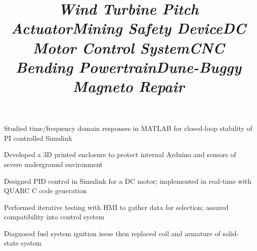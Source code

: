 \documentclass[mm]{res}
\newcommand{\tb}{\textbullet \xspace}
\begin{document}
\begin{resume}
\title{\textsl{Wind Turbine Pitch Actuator}}
\begin{position}
\tb Studied time/frequency domain responses in MATLAB for closed-loop stability of PI controlled Simulink
\end{position}

\title{\textsl{Mining Safety Device}}
\begin{position}
\tb Developed a 3D printed enclosure to protect internal Arduino and sensors of severe underground environment
\end{position}

\title{\textsl{DC Motor Control System}}
\begin{position}
\tb Designed PID control in Simulink for a DC motor; implemented in real-time with QUARC C code generation
\end{position}

\title{\textsl{CNC Bending Powertrain}}
\begin{position}
\tb Performed iterative testing with HMI to gather data for selection; assured compatibility into control system
\end{position}

\title{\textsl{Dune-Buggy Magneto Repair}}
\begin{position}
\tb Diagnosed fuel system ignition issue then replaced coil and armature of solid-state system
\end{position}

%


\end{resume}
\end{document}
